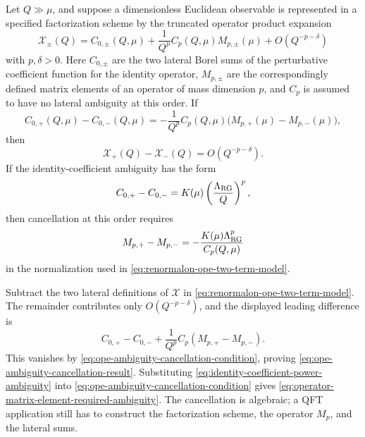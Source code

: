 \begin{remark}
\label{rem:ope-renormalon-ambiguity-cancellation}
Let \(Q\gg\mu\), and suppose a dimensionless Euclidean observable is represented
in a specified factorization scheme by the truncated operator product expansion
\begin{equation}
  \mathcal X_\pm(Q)
  =
  C_{0,\pm}(Q,\mu)
  +
  \frac{1}{Q^p} C_p(Q,\mu) M_{p,\pm}(\mu)
  +
  O(Q^{-p-\delta})
  \label{eq:renormalon-ope-two-term-model}
\end{equation}
with \(p,\delta>0\).  Here \(C_{0,\pm}\) are the two lateral Borel sums of the
perturbative coefficient function for the identity operator, \(M_{p,\pm}\) are
the correspondingly defined matrix elements of an operator of mass dimension
\(p\), and \(C_p\) is assumed to have no lateral ambiguity at this order.  If
\begin{equation}
  C_{0,+}(Q,\mu)-C_{0,-}(Q,\mu)
  =
  -
  \frac{1}{Q^p} C_p(Q,\mu)
  \bigl(M_{p,+}(\mu)-M_{p,-}(\mu)\bigr),
  \label{eq:ope-ambiguity-cancellation-condition}
\end{equation}
then
\begin{equation}
  \mathcal X_+(Q)-\mathcal X_-(Q)=O(Q^{-p-\delta}).
  \label{eq:ope-ambiguity-cancellation-result}
\end{equation}
If the identity-coefficient ambiguity has the form
\begin{equation}
  C_{0,+}-C_{0,-}
  =
  K(\mu)\left(\frac{\Lambda_{\rm RG}}{Q}\right)^p ,
  \label{eq:identity-coefficient-power-ambiguity}
\end{equation}
then cancellation at this order requires
\begin{equation}
  M_{p,+}-M_{p,-}
  =
  -
  \frac{K(\mu)\Lambda_{\rm RG}^p}{C_p(Q,\mu)}
  \label{eq:operator-matrix-element-required-ambiguity}
\end{equation}
in the normalization used in \eqref{eq:renormalon-ope-two-term-model}.
\par
Subtract the two lateral definitions of \(\mathcal X\) in
\eqref{eq:renormalon-ope-two-term-model}.  The remainder contributes only
\(O(Q^{-p-\delta})\), and the displayed leading difference is
\[
  C_{0,+}-C_{0,-}
  +
  \frac{1}{Q^p} C_p(M_{p,+}-M_{p,-}).
\]
This vanishes by \eqref{eq:ope-ambiguity-cancellation-condition}, proving
\eqref{eq:ope-ambiguity-cancellation-result}.  Substituting
\eqref{eq:identity-coefficient-power-ambiguity} into
\eqref{eq:ope-ambiguity-cancellation-condition} gives
\eqref{eq:operator-matrix-element-required-ambiguity}.  The cancellation is
algebraic; a QFT application still has to construct the factorization scheme,
the operator \(M_p\), and the lateral sums.
\end{remark}

